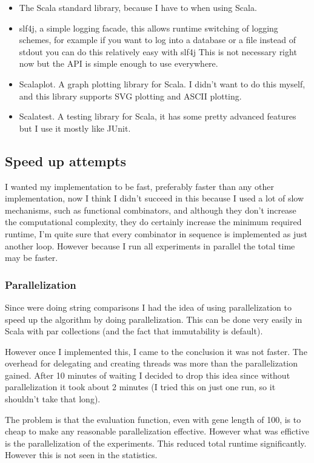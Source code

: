 \documentclass{article}
\begin{document}
\begin{empfile}
\begin{itemize}
	\item The Scala standard library, because I have to when using Scala.
	\item slf4j, a simple logging facade, this allows runtime switching of
		logging schemes, for example if you want to log into a database or
		a file instead of stdout you can do this relatively easy with slf4j
		This is not necessary right now but the API is simple enough to use
		everywhere.
	\item Scalaplot. A graph plotting library for Scala. I didn't want to
		do this myself, and this library supports SVG plotting and ASCII
		plotting.
	\item Scalatest. A testing library for Scala, it has some pretty advanced
		features but I use it mostly like JUnit.
\end{itemize}

\subsection{Speed up attempts}
I wanted my implementation to be fast, preferably faster than any other
implementation, now I think I didn't succeed in this because I used a
lot of slow mechanisms, such as functional combinators, and although
they don't increase the computational complexity, they do certainly increase
the minimum required runtime, I'm quite sure that every combinator in sequence
is implemented as just another loop. However because I
run all experiments in parallel the total time may be faster.
\subsubsection{Parallelization}
Since were doing string comparisons I had the idea of using parallelization to
speed up the algorithm by doing parallelization. This can be done very easily
in Scala with par collections (and the fact that immutability is default).

However once I implemented this, I came to the conclusion it was not faster.
The overhead for delegating and creating threads was more than the parallelization
gained.  After 10 minutes of waiting I decided to drop this idea
since without parallelization it took about 2 minutes (I tried this
on just one run, so it shouldn't take that long).

The problem is that the evaluation function, even with gene length of 100, is
to cheap to make any reasonable parallelization effective. However what was effictive
is the parallelization of the experiments. This reduced total runtime
significantly. However this is not seen in the statistics.


\end{empfile}
\end{document}
